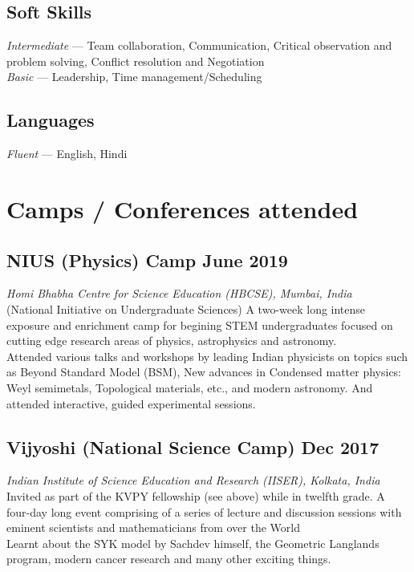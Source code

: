 \documentclass[11pt, a4paper]{article}
\begin{document}
\subsection{\large Soft Skills}
\hspace{0.01\linewidth}
\parbox{0.88\linewidth}{
    {\textit{Intermediate} --- \small Team collaboration, Communication, Critical observation and problem solving, Conflict resolution and Negotiation} \\
    {\textit{Basic} --- \small Leadership, Time management/Scheduling}
}
\vspace{-0.3cm}
\subsection{\large Languages}
\hspace{0.01\linewidth}
\parbox{0.88\linewidth}{
    {\textit{Fluent} --- \small English, Hindi}
}



\section{Camps / Conferences attended}

\subsection{NIUS (Physics) Camp \hfill \large{June 2019}}
\hspace{0.01\linewidth}
\parbox{0.88\linewidth}{
    \textit{Homi Bhabha Centre for Science Education (HBCSE), Mumbai, India} \\
    {\small (National Initiative on Undergraduate Sciences) A two-week long intense exposure and enrichment camp for begining STEM undergraduates focused on cutting edge research areas of physics, astrophysics and astronomy. \\
    Attended various talks and workshops by leading Indian physicists on topics such as Beyond Standard Model (BSM), New advances in Condensed matter physics: Weyl semimetals, Topological materials, etc., and modern astronomy. And attended interactive, guided experimental sessions.}
}

\subsection{Vijyoshi (National Science Camp) \hfill \large{Dec 2017}}
\hspace{0.01\linewidth}
\parbox{0.88\linewidth}{
    \textit{Indian Institute of Science Education and Research (IISER), Kolkata, India} \\
    {\small Invited as part of the KVPY fellowship (see above) while in twelfth grade. A four-day long event comprising of a series of lecture and discussion sessions with eminent scientists and mathematicians from over the World \\ Learnt about the SYK model by Sachdev himself, the Geometric Langlands program, modern cancer research and many other exciting things.}
}
\end{document}

